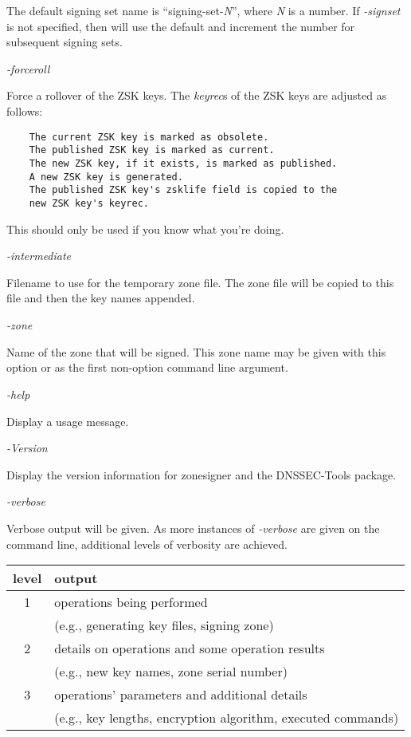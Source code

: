 \begin{description}
The default signing set name is ``signing-set-{\it N}'', where {\it N} is a
number.  If {\it -signset} is not specified, then  will use
the default and increment the number for subsequent signing sets.

\item {\it -forceroll}\verb" "

Force a rollover of the ZSK keys.  The {\it keyrec}s of the ZSK keys are
adjusted as follows:

\begin{verbatim}
    The current ZSK key is marked as obsolete.
    The published ZSK key is marked as current.
    The new ZSK key, if it exists, is marked as published.
    A new ZSK key is generated.
    The published ZSK key's zsklife field is copied to the
    new ZSK key's keyrec.
\end{verbatim}

This should only be used if you know what you're doing.

\item {\it -intermediate}\verb" "

Filename to use for the temporary zone file.  The zone file will be copied to
this file and then the key names appended.

\item {\it -zone}\verb" "

Name of the zone that will be signed.  This zone name may be given with this
option or as the first non-option command line argument.

\item {\it -help}\verb" "

Display a usage message.

\item {\it -Version}\verb" "

Display the version information for zonesigner and the DNSSEC-Tools package.

\item {\it -verbose}\verb" "

Verbose output will be given.  As more instances of {\it -verbose} are given on
the command line, additional levels of verbosity are achieved.

\begin{table}[ht]
\begin{center}
\begin{tabular}{c|l}
level  & output							 \\
\hline
1 & operations being performed					 \\
  & (e.g., generating key files, signing zone)			 \\
2 & details on operations and some operation results		 \\
  & (e.g., new key names, zone serial number)			 \\
3 & operations' parameters and additional details		 \\
  & (e.g., key lengths, encryption algorithm, executed commands) \\
\end{tabular} 
\end{center}
\end{table}


\end{description}
